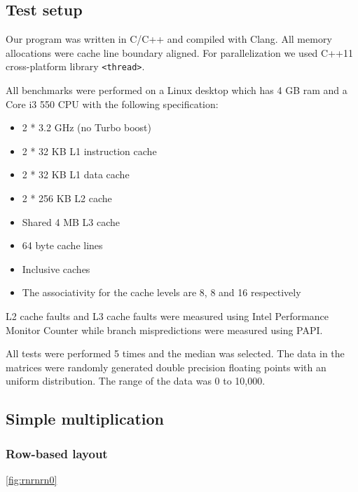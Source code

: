 \subsection{Test setup}

Our program was written in C/C++ and compiled with Clang. All memory allocations were cache line boundary aligned. For parallelization we used C++11 cross-platform library \texttt{<thread>}.

All benchmarks were performed on a Linux desktop which has 4 GB ram and a Core i3 550 CPU with the following specification:

\begin{itemize}
\item 2 * 3.2 GHz (no Turbo boost)
\item 2 * 32 KB L1 instruction cache
\item 2 * 32 KB L1 data cache
\item 2 * 256 KB L2 cache
\item Shared 4 MB L3 cache
\item 64 byte cache lines
\item Inclusive caches
\item The associativity for the cache levels are 8, 8 and 16 respectively
\end{itemize}

L2 cache faults and L3 cache faults were measured using Intel Performance Monitor Counter while branch mispredictions were measured using PAPI.

All tests were performed 5 times and the median was selected. The data in the matrices were randomly generated double precision floating points with
an uniform distribution. The range of the data was 0 to
10,000.

\subsection{Simple multiplication}

\subsubsection{Row-based layout}

\ref{fig:rnrnrn0}

